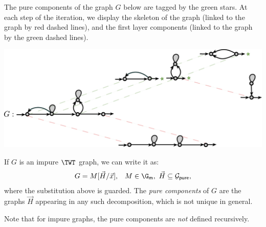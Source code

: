 \begin{example} The pure components of the graph $G$ below are  tagged  by the green stars.  At each step of the iteration, we display the skeleton of the graph (linked to the graph by red dashed lines), and the first layer components (linked to the graph by the green dashed lines). 
\begin{center}
\includegraphics[scale=.35]{skeleton-concrete}
\end{center}
\end{example}
\begin{definition}
If $G$ is an impure $\TWT$ graph, we can write it as:
$$
\begin{array}{ll}
G=M[ \vec{H}/\vec{x}], &M\in \G_\mathsf{m},\ \vec{H}\subseteq \mathcal{G}_\mathsf{pure},
\end{array}
$$
where the substitution above is guarded.  The \emph{pure components} of $G$ are the graphs $\vec{H}$ appearing in any such decomposition, which is not unique in general. 
\end{definition}
Note that for impure graphs, the pure components are \emph{not} defined recursively.
% 


